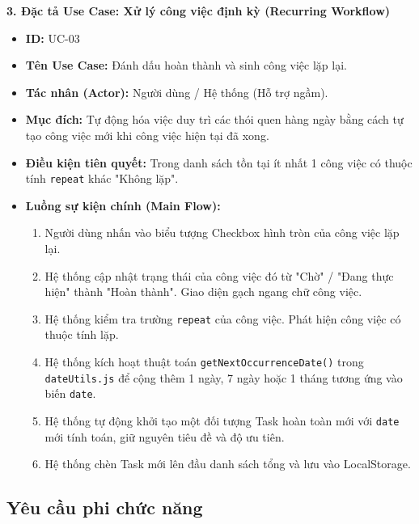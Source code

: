\textbf{3. Đặc tả Use Case: Xử lý công việc định kỳ (Recurring Workflow)}
\begin{itemize}
    \item \textbf{ID:} UC-03
    \item \textbf{Tên Use Case:} Đánh dấu hoàn thành và sinh công việc lặp lại.
    \item \textbf{Tác nhân (Actor):} Người dùng / Hệ thống (Hỗ trợ ngầm).
    \item \textbf{Mục đích:} Tự động hóa việc duy trì các thói quen hàng ngày bằng cách tự tạo công việc mới khi công việc hiện tại đã xong.
    \item \textbf{Điều kiện tiên quyết:} Trong danh sách tồn tại ít nhất 1 công việc có thuộc tính \texttt{repeat} khác "Không lặp".
    \item \textbf{Luồng sự kiện chính (Main Flow):}
    \begin{enumerate}
        \item Người dùng nhấn vào biểu tượng Checkbox hình tròn của công việc lặp lại.
        \item Hệ thống cập nhật trạng thái của công việc đó từ "Chờ" / "Đang thực hiện" thành "Hoàn thành". Giao diện gạch ngang chữ công việc.
        \item Hệ thống kiểm tra trường \texttt{repeat} của công việc. Phát hiện công việc có thuộc tính lặp.
        \item Hệ thống kích hoạt thuật toán \texttt{getNextOccurrenceDate()} trong \texttt{dateUtils.js} để cộng thêm 1 ngày, 7 ngày hoặc 1 tháng tương ứng vào biến \texttt{date}.
        \item Hệ thống tự động khởi tạo một đối tượng Task hoàn toàn mới với \texttt{date} mới tính toán, giữ nguyên tiêu đề và độ ưu tiên.
        \item Hệ thống chèn Task mới lên đầu danh sách tổng và lưu vào LocalStorage.
    \end{enumerate}
\end{itemize}

\subsection{Yêu cầu phi chức năng}

